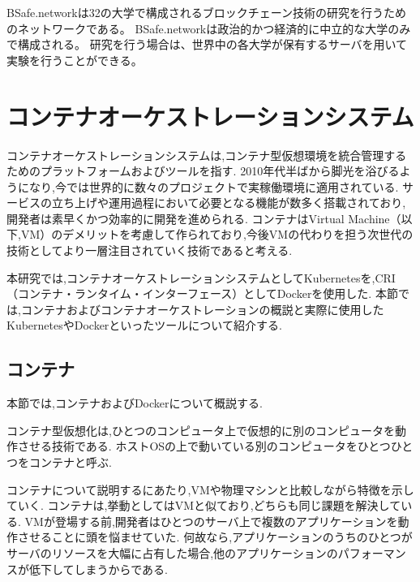 BSafe.networkは32の大学で構成されるブロックチェーン技術の研究を行うためのネットワークである。
BSafe.networkは政治的かつ経済的に中立的な大学のみで構成される。
研究を行う場合は、世界中の各大学が保有するサーバを用いて実験を行うことができる。

\section{コンテナオーケストレーションシステム}
\label{background:container-orchestration-system}

コンテナオーケストレーションシステムは,コンテナ型仮想環境を統合管理するためのプラットフォームおよびツールを指す.
2010年代半ばから脚光を浴びるようになり,今では世界的に数々のプロジェクトで実稼働環境に適用されている.
サービスの立ち上げや運用過程において必要となる機能が数多く搭載されており,開発者は素早くかつ効率的に開発を進められる.
コンテナはVirtual Machine（以下,VM）のデメリットを考慮して作られており,今後VMの代わりを担う次世代の技術としてより一層注目されていく技術であると考える.

本研究では,コンテナオーケストレーションシステムとしてKubernetesを,CRI（コンテナ・ランタイム・インターフェース）としてDockerを使用した.
本節では,コンテナおよびコンテナオーケストレーションの概説と実際に使用したKubernetesやDockerといったツールについて紹介する.

\subsection{コンテナ}
\label{background:container-orchestration-system:container}

本節では,コンテナおよびDockerについて概説する.

コンテナ型仮想化は,ひとつのコンピュータ上で仮想的に別のコンピュータを動作させる技術である.
ホストOSの上で動いている別のコンピュータをひとつひとつをコンテナと呼ぶ.

コンテナについて説明するにあたり,VMや物理マシンと比較しながら特徴を示していく.
コンテナは,挙動としてはVMと似ており,どちらも同じ課題を解決している.
VMが登場する前,開発者はひとつのサーバ上で複数のアプリケーションを動作させることに頭を悩ませていた.
何故なら,アプリケーションのうちのひとつがサーバのリソースを大幅に占有した場合,他のアプリケーションのパフォーマンスが低下してしまうからである.


